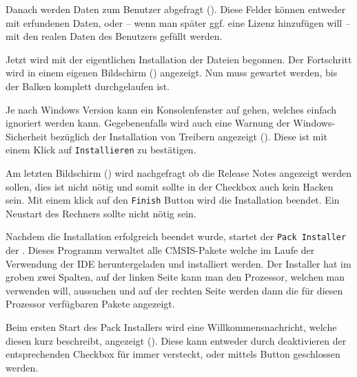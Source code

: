 Danach werden Daten zum Benutzer abgefragt (). Diese Felder können entweder mit erfundenen Daten, oder -- wenn man später ggf. eine Lizenz hinzufügen will -- mit den realen Daten des Benutzers gefüllt werden.


Jetzt wird mit der eigentlichen Installation der Dateien begonnen. Der Fortschritt wird in einem eigenen Bildschirm () angezeigt. Nun muss gewartet werden, bis der Balken komplett durchgelaufen ist.


Je nach Windows Version kann ein Konsolenfenster auf gehen, welches einfach ignoriert werden kann. Gegebenenfalls wird auch eine Warnung der Windows-Sicherheit bezüglich der Installation von Treibern angezeigt (). Diese ist mit einem Klick auf \texttt{Installieren} zu bestätigen.


Am letzten Bildschirm () wird nachgefragt ob die Release Notes angezeigt werden sollen, dies ist nicht nötig und somit sollte in der Checkbox auch kein Hacken sein. Mit einem klick auf den \texttt{Finish} Button wird die Installation beendet. Ein Neustart des Rechners sollte nicht nötig sein.

\label{sec:tut-firstproject2}
Nachdem die Installation erfolgreich beendet wurde, startet der \texttt{Pack Installer} der \uVision{}. Dieses Programm verwaltet alle \gls{CMSIS}-Pakete welche im Laufe der Verwendung der \gls{IDE} heruntergeladen und installiert werden. Der Installer hat im groben zwei Spalten, auf der linken Seite kann man den Prozessor, welchen man verwenden will, aussuchen und auf der rechten Seite werden dann die für diesen Prozessor verfügbaren Pakete angezeigt.


Beim ersten Start des Pack Installers wird eine Willkommensnachricht, welche diesen kurz beschreibt, angezeigt (). Diese kann entweder durch deaktivieren der entsprechenden Checkbox für immer versteckt, oder mittels Button geschlossen werden.

